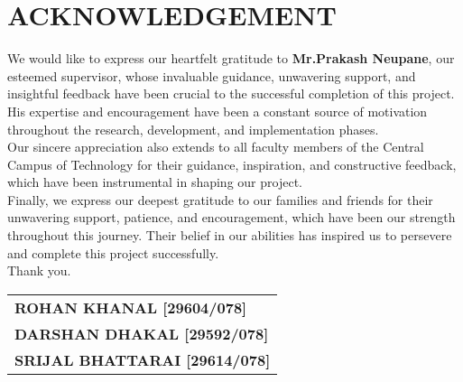 
\section*{\Large\centering \textbf{ACKNOWLEDGEMENT}}
We would like to express our heartfelt gratitude to \textbf{Mr.\@ Prakash Neupane}, our esteemed supervisor, whose invaluable guidance, unwavering support, and insightful feedback have been crucial to the successful completion of this project. His expertise and encouragement have been a constant source of motivation throughout the research, development, and implementation phases.\\[0.5em]
Our sincere appreciation also extends to all faculty members of the Central Campus of Technology for their guidance, inspiration, and constructive feedback, which have been instrumental in shaping our project.\\[0.5em]
Finally, we express our deepest gratitude to our families and friends for
their unwavering support, patience, and encouragement, which have been our strength
throughout this journey. Their belief in our abilities has inspired us to persevere and
complete this project successfully.\\[0.5em]
Thank you.


\begin{flushright}
\begin{tabular}{l}
\textbf{ROHAN KHANAL [29604/078]}\\
\textbf{DARSHAN DHAKAL [29592/078]}\\
\textbf{SRIJAL BHATTARAI [29614/078]}\\
\end{tabular}
\end{flushright}

\newpage